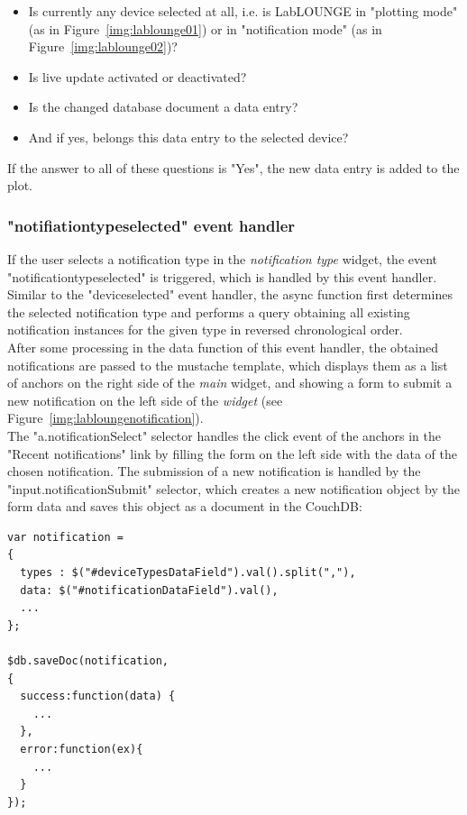 \begin{itemize}
	\item Is currently any device selected at all, i.e. is LabLOUNGE in "plotting mode" (as in Figure~\ref{img:lablounge01}) or in "notification mode" (as in Figure~\ref{img:lablounge02})?
	\item Is live update activated or deactivated?
	\item Is the changed database document a data entry?
	\item And if yes, belongs this data entry to the selected device?
\end{itemize}

If the answer to all of these questions is "Yes", the new data entry is added to the plot.

\subsubsection{"notifiationtypeselected" event handler}
\label{couchapp:labloungedeveloper:main:notifiationtypeselected}
If the user selects a notification type in the \emph{notification type} widget, the event "notificationtypeselected" is triggered, which is handled by this event handler.\\
Similar to the "deviceselected" event handler, the async function first determines the selected notification type and performs a query obtaining all existing notification instances for the given type in reversed chronological order.\\
After some processing in the data function of this event handler, the obtained notifications are passed to the mustache template, which displays them as a list of anchors on the right side of the \emph{main} widget, and showing a form to submit a new notification on the left side of the \emph{widget} (see Figure~\ref{img:labloungenotification}).\\
The "a.notificationSelect" selector handles the click event of the anchors in the "Recent notifications" link by filling the form on the left side with the data of the chosen notification. The submission of a new notification is handled by the "input.notificationSubmit" selector, which creates a new notification object by the form data and saves this object as a document in the CouchDB:
\begin{lstlisting}
var notification =
{
  types : $("#deviceTypesDataField").val().split(","),
  data: $("#notificationDataField").val(),
  ...
};

$db.saveDoc(notification,
{
  success:function(data) {
    ...
  },
  error:function(ex){
    ...
  }
});
\end{lstlisting}